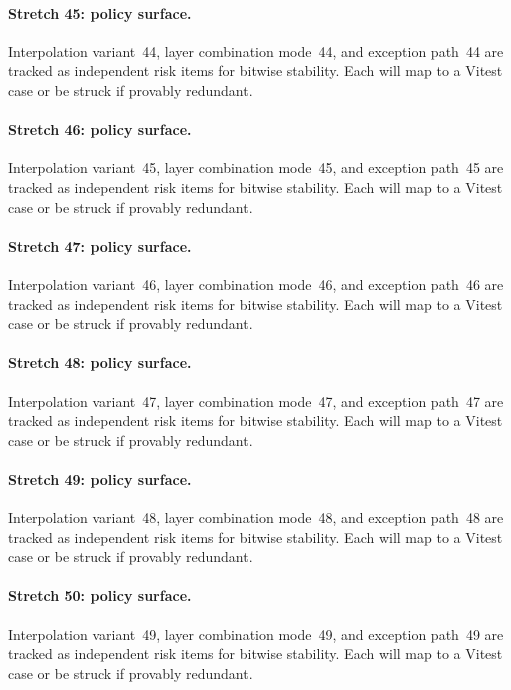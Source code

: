 \documentclass[sigconf,nonacm]{acmart}
\begin{document}
\paragraph{Stretch 45: policy surface.}
Interpolation variant~44, layer combination mode~44, and exception path~44 are tracked as independent risk items for bitwise stability. Each will map to a Vitest case or be struck if provably redundant. %

\paragraph{Stretch 46: policy surface.}
Interpolation variant~45, layer combination mode~45, and exception path~45 are tracked as independent risk items for bitwise stability. Each will map to a Vitest case or be struck if provably redundant. %

\paragraph{Stretch 47: policy surface.}
Interpolation variant~46, layer combination mode~46, and exception path~46 are tracked as independent risk items for bitwise stability. Each will map to a Vitest case or be struck if provably redundant. %

\paragraph{Stretch 48: policy surface.}
Interpolation variant~47, layer combination mode~47, and exception path~47 are tracked as independent risk items for bitwise stability. Each will map to a Vitest case or be struck if provably redundant. %

\paragraph{Stretch 49: policy surface.}
Interpolation variant~48, layer combination mode~48, and exception path~48 are tracked as independent risk items for bitwise stability. Each will map to a Vitest case or be struck if provably redundant. %

\paragraph{Stretch 50: policy surface.}
Interpolation variant~49, layer combination mode~49, and exception path~49 are tracked as independent risk items for bitwise stability. Each will map to a Vitest case or be struck if provably redundant. %
\end{document}
